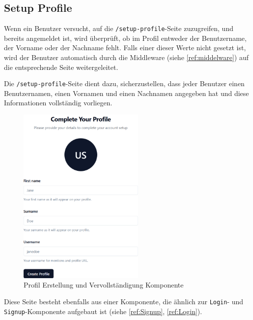 \begin{inhalt}
\clearpage

\newpage

\section{Setup Profile}
\label{ref:profile-setup}

Wenn ein Benutzer versucht, auf die \texttt{/setup-profile}-Seite zuzugreifen, und bereits angemeldet ist, wird überprüft, ob im Profil entweder der Benutzername, der Vorname oder der Nachname fehlt.  
Falls einer dieser Werte nicht gesetzt ist, wird der Benutzer automatisch durch die Middleware (siehe \ref{ref:middelware}) auf die entsprechende Seite weitergeleitet.

\vspace{0.25cm}

Die \texttt{/setup-profile}-Seite dient dazu, sicherzustellen, dass jeder Benutzer einen Benutzernamen, einen Vornamen und einen Nachnamen angegeben hat und diese Informationen vollständig vorliegen.

\begin{figure}[!htb]
\centering
\includegraphics[width=0.55\textwidth]{files/Thomas/pics/Website/setup-profile/setup-profile.png}
\caption[Profil Erstellung und Vervollständigung Komponente]{Profil Erstellung und Vervollständigung Komponente}
\label{fig:gehaeuse_internet_bild}
\end{figure}

\clearpage

Diese Seite besteht ebenfalls aus einer Komponente, die ähnlich zur \texttt{Login}- und \texttt{Signup}-Komponente aufgebaut ist (siehe \ref{ref:Signup}, \ref{ref:Login}).


\end{inhalt}
